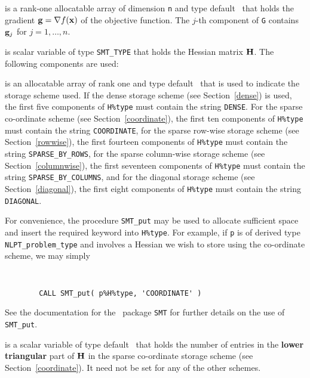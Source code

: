 \documentclass{galahad}
\newcommand{\Grad}{\nabla}
\begin{document}
\begin{description}
\begin{description}
 is a rank-one allocatable array of dimension {\tt n} and type 
default \realdp\ that holds the gradient $\bmg = \Grad f(\bmx)$ 
of the objective function.
The $j$-th component of 
{\tt G} contains ${\mathbf{g}}_{j}$ for $j = 1, \ldots, n$.

\end{description}

 is scalar variable of type {\tt SMT\_TYPE} 
that holds the Hessian matrix ${\mathbf{H}}$. The following components
are used:

\begin{description}

 is an allocatable array of rank one and type default 
\character\ that
is used to indicate the storage scheme used. If the dense storage scheme 
(see Section~\ref{dense}) is used, 
the first five components of {\tt H\%type} must contain the
string {\tt DENSE}.
For the sparse co-ordinate scheme (see Section~\ref{coordinate}), 
the first ten components of {\tt H\%type} must contain the
string {\tt COORDINATE},  
for the sparse row-wise storage scheme (see Section~\ref{rowwise}),
the first fourteen components of {\tt H\%type} must contain the
string {\tt SPARSE\_BY\_ROWS},
for the sparse column-wise storage scheme (see Section~\ref{columnwise}),
the first seventeen components of {\tt H\%type} must contain the
string {\tt SPARSE\_BY\_COLUMNS},
and for the diagonal storage scheme (see Section~\ref{diagonal}),
the first eight components of {\tt H\%type} must contain the
string {\tt DIAGONAL}.

For convenience, the procedure {\tt SMT\_put} 
may be used to allocate sufficient space and insert the required keyword
into {\tt H\%type}.
For example, if {\tt p} is of derived type {\tt NLPT\_problem\_type}
and involves a Hessian we wish to store using the co-ordinate scheme,
we may simply
{\tt 
\begin{verbatim}
        CALL SMT_put( p%H%type, 'COORDINATE' )
\end{verbatim}
}
\noindent
See the documentation for the \galahad\ package {\tt SMT} 
for further details on the use of {\tt SMT\_put}.

 is a scalar variable of type default \integer\ that 
holds the number of entries in the {\bf lower triangular} part of ${\mathbf{H}}$
in the sparse co-ordinate storage scheme (see Section~\ref{coordinate}). 
It need not be set for any of the other schemes.


\end{description}
\end{description}
\end{document}
